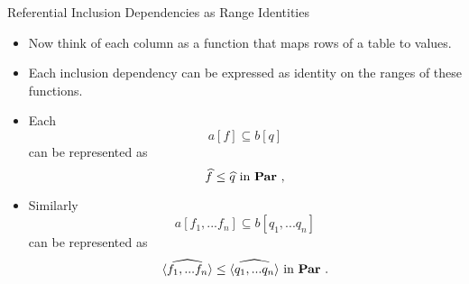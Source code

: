 \begin{frame}{Referential Inclusion Dependencies as Range Identities}

\begin{itemize}
\item Now think of each column as a function that maps rows of a table to values.
\item Each inclusion dependency can be expressed as identity on the ranges of these functions.
\item Each $$a[f] \subseteq b[q]$$
can be represented as
$$\widehat{f} \leq \widehat{q} \mbox{ in \ensuremath{\textbf{Par}} ,}$$
\item Similarly $$a[f_1,...f_n] \subseteq b[q_1,...q_n]$$
can be represented as
$$\widehat{\langle f_1,...f_n\rangle} \leq \widehat{\langle q_1,...q_n\rangle} \mbox{ in \ensuremath{\textbf{Par}} .}$$
\end{itemize}

\end{frame}
